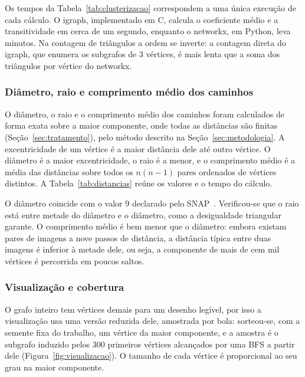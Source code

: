 Os tempos da Tabela~\ref{tab:clusterizacao} correspondem a uma única execução de cada cálculo. O igraph, implementado em C, calcula o coeficiente médio e a transitividade em cerca de um segundo, enquanto o networkx, em Python, leva minutos. Na contagem de triângulos a ordem se inverte: a contagem direta do igraph, que enumera os subgrafos de 3 vértices, é mais lenta que a soma dos triângulos por vértice do networkx.

\subsubsection{Diâmetro, raio e comprimento médio dos caminhos}

O diâmetro, o raio e o comprimento médio dos caminhos foram calculados de forma exata sobre a maior componente, onde todas as distâncias são finitas (Seção~\ref{sec:tratamento}), pelo método descrito na Seção~\ref{sec:metodologia}. A excentricidade de um vértice é a maior distância dele até outro vértice. O diâmetro é a maior excentricidade, o raio é a menor, e o comprimento médio é a média das distâncias sobre todos os $n(n-1)$ pares ordenados de vértices distintos. A Tabela~\ref{tab:distancias} reúne os valores e o tempo do cálculo.

\begin{table}[htbp]
  \centering
  \caption{Diâmetro, raio e comprimento médio dos caminhos da maior componente, calculados de forma exata com uma BFS a partir de cada vértice, e o tempo dessa passagem de BFS.}
  \label{tab:distancias}
  
\end{table}

O diâmetro coincide com o valor 9 declarado pelo SNAP~\cite{snapnets}. Verificou-se que o raio está entre metade do diâmetro e o diâmetro, como a desigualdade triangular garante. O comprimento médio é bem menor que o diâmetro: embora existam pares de imagens a nove passos de distância, a distância típica entre duas imagens é inferior à metade dele, ou seja, a componente de mais de cem mil vértices é percorrida em poucos saltos.

\subsubsection{Visualização e cobertura}

O grafo inteiro tem vértices demais para um desenho legível, por isso a visualização usa uma versão reduzida dele, amostrada por bola: sorteou-se, com a semente fixa do trabalho, um vértice da maior componente, e a amostra é o subgrafo induzido pelos 300 primeiros vértices alcançados por uma BFS a partir dele (Figura~\ref{fig:visualizacao}). O tamanho de cada vértice é proporcional ao seu grau na maior componente.

